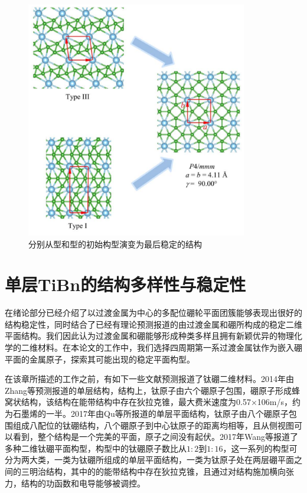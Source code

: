 \begin{figure}
  \includegraphics[width=0.86\textwidth]{figs/ch5_cell_change.png}
  \centering
  \caption{分别从型和型的初始构型演变为最后稳定的结构}
  \label{fig:ch5_cell_change}
\end{figure}

\section{单层TiBn的结构多样性与稳定性}
在绪论部分已经介绍了以过渡金属为中心的多配位硼轮平面团簇能够表现出很好的结构稳定性，同时结合了已经有理论预测报道的由过渡金属和硼所构成的稳定二维平面结构。我们因此认为过渡金属和硼能够形成种类多样且拥有新颖优异的物理化学的二维材料。在本论文的工作中，我们选择四周期第一系过渡金属钛作为嵌入硼平面的金属原子，探索其可能出现的稳定平面构型。

在该章所描述的工作之前，有如下一些文献预测报道了钛硼二维材料。2014年由Zhang等预测报道的单层结构\cite{zhang2014prediction}，结构上，钛原子由六个硼原子包围，硼原子形成蜂窝状结构，该结构在能带结构中存在狄拉克锥，最大费米速度为0.57×106m/s，约为石墨烯的一半。2017年由Qu等所报道的单层平面结构\cite{qu2017two}，钛原子由八个硼原子包围组成八配位的钛硼结构，八个硼原子到中心钛原子的距离均相等，且从侧视图可以看到，整个结构是一个完美的平面，原子之间没有起伏。2017年Wang\cite{wang2017semimetallic}等报道了多种二维钛硼平面构型，构型中的钛硼原子数比从$1:2$到$1:16$，这一系列的构型可分为两大类，一类为钛硼所组成的单层平面结构，一类为钛原子处在两层硼平面之间的三明治结构，其中的的能带结构中存在狄拉克锥，且通过对结构施加横向张力，结构的功函数和电导能够被调控。

